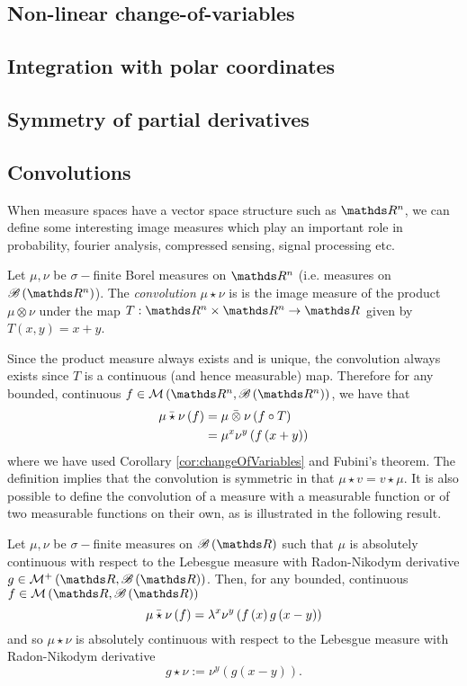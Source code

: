 \subsection{Non-linear change-of-variables}

\subsection{Integration with polar coordinates}

\subsection{Symmetry of partial derivatives}

\subsection{Convolutions\label{subsec:convolutions}}

When measure spaces have a vector space structure such as $\R^{n}$,
we can define some interesting image measures which play an important
role in probability, fourier analysis, compressed sensing, signal
processing etc.
\begin{defn}
\label{def:convolution}Let $\mu,\nu$ be $\sigma-$finite Borel measures
on $\R^{n}$ (i.e. measures on $\borel\left(\R^{n}\right)$). The
\emph{convolution} $\mu\star\nu$ is is the image measure of the product
$\mu\otimes\nu$ under the map $T:\R^{n}\times\R^{n}\to\R$ given
by $T\left(x,y\right)=x+y$.

Since the product measure always exists and is unique, the convolution
always exists since $T$ is a continuous (and hence measurable) map.
Therefore for any bounded, continuous $f\in\mathcal{M}\left(\R^{n},\borel\left(\R^{n}\right)\right)$,
we have that
\begin{align*}
\bar{\mu\star\nu}\left(f\right) & =\bar{\mu\otimes\nu}\left(f\circ T\right)\\
 & =\mu^{x}\nu^{y}\left(f\left(x+y\right)\right)
\end{align*}
where we have used Corollary \ref{cor:changeOfVariables} and Fubini's
theorem. The definition implies that the convolution is symmetric
in that $\mu\star v=v\star\mu$. It is also possible to define the
convolution of a measure with a measurable function or of two measurable
functions on their own, as is illustrated in the following result.
\end{defn}

\begin{prop}
\label{prop:convolutionFunctions}Let $\mu,\nu$ be $\sigma-$finite
measures on $\borel\left(\R\right)$ such that $\mu$ is absolutely
continuous with respect to the Lebesgue measure with Radon-Nikodym
derivative $g\in\mathcal{M}^{+}\left(\R,\borel\left(\R\right)\right)$.
Then, for any bounded, continuous $f\in\mathcal{M}\left(\R,\borel\left(\R\right)\right)$
\[
\bar{\mu\star\nu}\left(f\right)=\lambda^{x}\nu^{y}\left(f\left(x\right)g\left(x-y\right)\right)
\]
 and so $\mu\star\nu$ is absolutely continuous with respect to the
Lebesgue measure with Radon-Nikodym derivative 
\[
g\star\nu:=\nu^{y}\left(g\left(x-y\right)\right).
\]
\end{prop}


